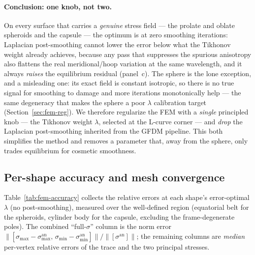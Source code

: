\documentclass[11pt]{article}
\begin{document}
\paragraph{Conclusion: one knob, not two.}  On every surface that carries a
\emph{genuine} stress field --- the prolate and oblate spheroids and the capsule ---
the optimum is at zero smoothing iterations: Laplacian post-smoothing cannot lower the
error below what the Tikhonov weight already achieves, because any pass that
suppresses the spurious anisotropy also flattens the real meridional/hoop variation at
the same wavelength, and it always \emph{raises} the equilibrium residual (panel~c).
The sphere is the lone exception, and a misleading one: its exact field is constant
isotropic, so there is no true signal for smoothing to damage and more iterations
monotonically help --- the same degeneracy that makes the sphere a poor $\lambda$
calibration target (Section~\ref{sec:fem-reg}).  We therefore regularize the FEM with
a \emph{single} principled knob --- the Tikhonov weight $\lambda$, selected at the
L-curve corner --- and \emph{drop} the Laplacian post-smoothing inherited from the
GFDM pipeline.  This both simplifies the method and removes a parameter that, away
from the sphere, only trades equilibrium for cosmetic smoothness.

\subsection{Per-shape accuracy and mesh convergence}
\label{sec:fem-accuracy}

Table~\ref{tab:fem-accuracy} collects the relative errors at each shape's
error-optimal $\lambda$ (no post-smoothing), measured over the well-defined region
(equatorial belt for the spheroids, cylinder body for the capsule, excluding the
frame-degenerate poles).  The combined ``full-$\sigma$'' column is the norm error
$\|[\sigma_{\max}{-}\sigma_{\max}^{\mathrm{an}},\,
\sigma_{\min}{-}\sigma_{\min}^{\mathrm{an}}]\|/\|[\sigma^{\mathrm{an}}]\|$; the
remaining columns are \emph{median} per-vertex relative errors of the trace and the two
principal stresses.
\end{document}
